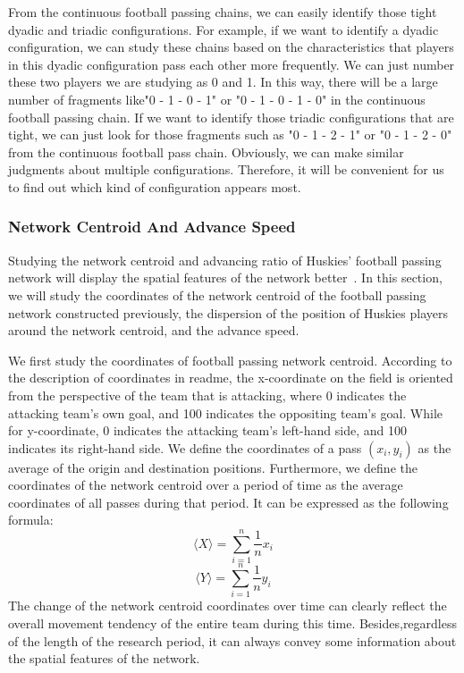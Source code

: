 \documentclass{mcmthesis}
\begin{document}
	From the continuous football passing chains, we can easily identify those tight dyadic and triadic configurations.  For example, if we want to identify a dyadic configuration, we can study these chains based on the characteristics that players in this dyadic configuration pass each other more frequently.  We can just number these two players we are studying as 0 and 1. In this way, there will be a large number of fragments like"0 - 1 - 0 - 1" or "0 - 1 - 0 - 1 - 0" in the continuous football passing chain.  If we want to identify those triadic configurations that are tight, we can just look for those fragments such as "0 - 1 - 2 - 1" or "0 - 1 - 2 - 0" from the continuous football pass chain.  Obviously, we can make similar judgments about multiple configurations.  Therefore, it will be convenient for us to find out which kind of configuration appears most.
\subsubsection{Network Centroid And Advance Speed}
	Studying the network centroid and advancing ratio of Huskies' football passing network will display the spatial features of the network better~\cite{First}.  In this section, we will study the coordinates of the network centroid of the football passing network constructed previously, the dispersion of the position of Huskies players around the network centroid, and the advance speed.

	We first study the coordinates of football passing network centroid.  According to the description of coordinates in readme, the x-coordinate on the field is oriented from the perspective of the team that is attacking, where 0 indicates the attacking team's own goal, and 100 indicates the oppositing team's goal.  While for y-coordinate, 0 indicates the attacking team's left-hand side, and 100 indicates its right-hand side.  We define the coordinates of a pass $(x_{i}, y_{i})$ as the average of the origin and destination positions.  Furthermore, we define the coordinates of the network centroid over a period of time as the average coordinates of all passes during that period.  It can be expressed as the following formula: 
	$$\langle X \rangle=\sum_{i=1}^n\frac{1}{n} x_{i}$$
	$$\langle Y \rangle=\sum_{i=1}^n\frac{1}{n} y_{i}$$
	The change of the network centroid coordinates over time can clearly reflect the overall movement tendency of the entire team during this time.  Besides,regardless of the length of the research period, it can always convey some information about the spatial features of the network.
\end{document}
